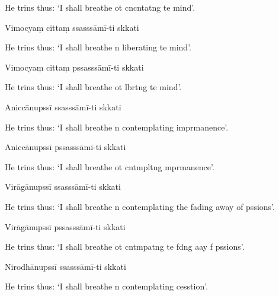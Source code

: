 \begin{english}
  He trins thus: `I shall breathe ot cncntatng te mind'.
\end{english}

Vimocyaṃ cittaṃ ssasssāmī-ti skkati

\begin{english}
  He trins thus: `I shall breathe n liberating te mind'.
\end{english}

Vimocyaṃ cittaṃ pssasssāmī-ti skkati

\begin{english}
  He trins thus: `I shall breathe ot lbrtng te mind'.
\end{english}

Aniccānupssī ssasssāmī-ti skkati

\begin{english}
  He trins thus: `I shall breathe n contemplating imprmanence'.
\end{english}

Aniccānupssī pssasssāmī-ti skkati

\begin{english}
  He trins thus: `I shall breathe ot cntmpltng mprmanence'.
\end{english}

Virāgānupssī ssasssāmī-ti skkati

\begin{english}
  He trins thus: `I shall breathe n contemplating the fading away of pssions'.
\end{english}

Virāgānupssī pssasssāmī-ti skkati

\begin{english}
  He trins thus: `I shall breathe ot cntmpatng te fdng aay f pssions'.
\end{english}

Nirodhānupssī ssasssāmī-ti skkati

\begin{english}
  He trins thus: `I shall breathe n contemplating cesstion'.
\end{english}

